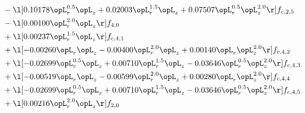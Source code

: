 \begin{alignat}{2}
& - \l[  0.10178 \opL_r^{0.5} \opL_z +  0.02003 \opL_r^{1.5} \opL_z +  0.07507 \opL_r^{0.5} \opL_z^{2.0}  \r] f_{c,2,5} \nonumber \\ 
& - \l[  0.00100 \opL_r^{2.0} \opL_z  \r] f_{4,0} \nonumber \\ 
& + \l[  0.00237 \opL_r^{1.5} \opL_z  \r] f_{c,4,1} \nonumber \\ 
& + \l[  -0.00260 \opL_r \opL_z   -0.00400 \opL_r^{2.0} \opL_z +  0.00140 \opL_r \opL_z^{2.0}  \r] f_{c,4,2} \nonumber \\ 
& + \l[  -0.02699 \opL_r^{0.5} \opL_z +  0.00710 \opL_r^{1.5} \opL_z   -0.03646 \opL_r^{0.5} \opL_z^{2.0}  \r] f_{c,4,3} \nonumber \\ 
& + \l[  -0.00519 \opL_r \opL_z   -0.00599 \opL_r^{2.0} \opL_z +  0.00280 \opL_r \opL_z^{2.0}  \r] f_{c,4,4} \nonumber \\ 
& + \l[  -0.02699 \opL_r^{0.5} \opL_z +  0.00710 \opL_r^{1.5} \opL_z   -0.03646 \opL_r^{0.5} \opL_z^{2.0}  \r] f_{c,4,5} \nonumber \\ 
& + \l[  0.00216 \opL_r^{2.0} \opL_z  \r] f_{2,0} \nonumber \\ 
\end{alignat} 


